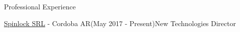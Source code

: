 \documentclass{resume}
\begin{document}
\begin{rSection}{Professional Experience}
\begin{rSubsection}{\href{https://spinlock.com.ar}{Spinlock SRL} - Cordoba AR}{(May 2017 - Present)}{New Technologies Director}{}

    
    



\end{rSubsection}
\end{rSection}
\end{document}
